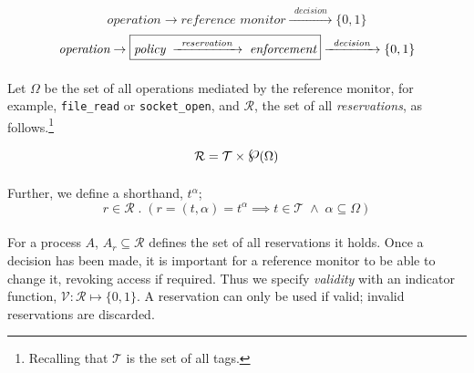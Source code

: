 \begin{equation}\label{eqn:res-1}
    \textit{operation} \rightarrow \boxed{\textit{reference monitor}} \xrightarrow{\;\;\textit{decision}\;\;} \{0,1\}
\end{equation}
\vspace{-3mm}
\begin{equation}\label{eqn:res-2}
    \textit{operation} \rightarrow \boxed{\textit{policy}\; \xrightarrow{\;\;\textit{reservation}\;\;} \;\textit{enforcement}} \xrightarrow{\;\;\textit{decision}\;\;} \{0,1\}
    \vspace{3mm}
\end{equation}


\paragraph{} Let $\Omega$ be the set of all operations mediated by the reference monitor, for example, \texttt{file\_read} or \texttt{socket\_open}, and $\mathcal{R}$, the set of all \textit{reservations}, as follows.\footnote{Recalling that $\mathcal{T}$ is the set of all tags.}

\newcommand{\powerset}{\raisebox{.15\baselineskip}{\Large\ensuremath{\wp}}}
\vspace{-3mm}
\begin{equation*}
    \mathcal{R} = \mathcal{T} \times \powerset(\Omega)
    \vspace{2mm}
\end{equation*}

\paragraph{} Further, we define a shorthand, $t^{\alpha}$;
\begin{equation*}
    r \in \mathcal{R} \;.\; (r = (t, \alpha) = t^{\alpha} \implies t \in \mathcal{T} \; \wedge \; \alpha \subseteq \Omega)
\end{equation*}

\paragraph{} For a process $A$, $A_{r} \subseteq \mathcal{R}$ defines the set of all reservations it holds. Once a decision has been made, it is important for a reference monitor to be able to change it, revoking access if required. Thus we specify \textit{validity} with an indicator function, $\mathcal{V}: \mathcal{R} \mapsto \{0,1\}$. A reservation can only be used if valid; invalid reservations are discarded.

